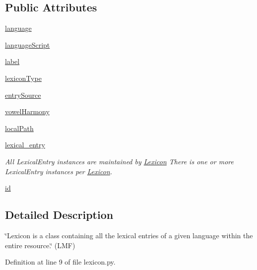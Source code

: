 \subsection*{Public Attributes}
\begin{DoxyCompactItemize}
\item 
\hyperlink{classlmf_1_1src_1_1core_1_1lexicon_1_1_lexicon_a17a5f90d6242843af84f145aea4dfe76}{language}
\item 
\hyperlink{classlmf_1_1src_1_1core_1_1lexicon_1_1_lexicon_a33c93912a6bedb0eb095cf85245d6051}{language\+Script}
\item 
\hyperlink{classlmf_1_1src_1_1core_1_1lexicon_1_1_lexicon_a728727809066956b10125e62a954c9c5}{label}
\item 
\hyperlink{classlmf_1_1src_1_1core_1_1lexicon_1_1_lexicon_af434e15172d6aa59954db2a72c9f15f0}{lexicon\+Type}
\item 
\hyperlink{classlmf_1_1src_1_1core_1_1lexicon_1_1_lexicon_a2c62e9663fe3771e684fb4ef94fe1d52}{entry\+Source}
\item 
\hyperlink{classlmf_1_1src_1_1core_1_1lexicon_1_1_lexicon_a0c55ecd82285a7d3dc5d5ebcb1445c25}{vowel\+Harmony}
\item 
\hyperlink{classlmf_1_1src_1_1core_1_1lexicon_1_1_lexicon_a972bee199d27a70fa75321bffd70a6b1}{local\+Path}
\item 
\hyperlink{classlmf_1_1src_1_1core_1_1lexicon_1_1_lexicon_a548b2adbf028d9058dd4676cc00d2ee1}{lexical\+\_\+entry}
\begin{DoxyCompactList}\small\item\em All Lexical\+Entry instances are maintained by \hyperlink{classlmf_1_1src_1_1core_1_1lexicon_1_1_lexicon}{Lexicon} There is one or more Lexical\+Entry instances per \hyperlink{classlmf_1_1src_1_1core_1_1lexicon_1_1_lexicon}{Lexicon}. \end{DoxyCompactList}\item 
\hyperlink{classlmf_1_1src_1_1core_1_1lexicon_1_1_lexicon_a8d47ac22571af27a1e989c2c7b14e80b}{id}
\end{DoxyCompactItemize}


\subsection{Detailed Description}
\char`\"{}\+Lexicon is a class containing all the lexical entries of a given language within the entire resource.\char`\"{} (L\+M\+F) 

Definition at line 9 of file lexicon.\+py.



